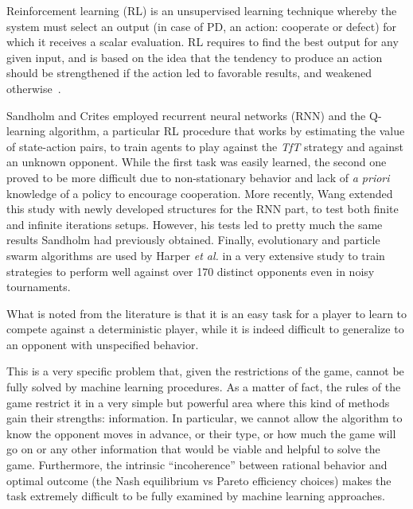\documentclass[journal,10pt,twoside]{IEEEtran}
\begin{document}
Reinforcement learning (RL) is an unsupervised learning technique whereby the system must select an output (in case of PD, an action: cooperate or defect) for which it receives a scalar evaluation. RL requires to find the best output for any given input, and is based on the idea that the tendency to produce an action should be strengthened if the action led to favorable results, and weakened otherwise~\cite{sandholmRL}.

Sandholm and Crites \cite{sandholmRL} employed recurrent neural networks (RNN) and the Q-learning algorithm, a particular RL procedure that works by estimating the value of state-action pairs, to train agents to play against the \textit{TfT} strategy and against an unknown opponent. While the first task was easily learned, the second one proved to be more difficult due to non-stationary behavior and lack of \textit{a priori} knowledge of a policy to encourage cooperation.
More recently, Wang \cite{kedaoRL} extended this study with newly developed structures for the RNN part, to test both finite and infinite iterations setups. However, his tests led to pretty much the same results Sandholm had previously obtained.
Finally, evolutionary and particle swarm algorithms are used by Harper \textit{et al.} in a very extensive study \cite{plosRLdominant} to train strategies to perform well against over 170 distinct opponents even in noisy tournaments.

What is noted from the literature is that it is an easy task for a player to learn to compete against a deterministic player, while it is indeed difficult to generalize to an opponent with unspecified behavior.

This is a very specific problem that, given the restrictions of the game, cannot be fully solved by machine learning procedures. As a matter of fact, the rules of the game restrict it in a very simple but powerful area where this kind of methods gain their strengths: information. In particular, we cannot allow the algorithm to know the opponent moves in advance, or their type, or how much the game will go on or any other information that would be viable and helpful to solve the game. Furthermore, the intrinsic ``incoherence'' between rational behavior and optimal outcome (the Nash equilibrium vs Pareto efficiency choices) makes the task extremely difficult to be fully examined by machine learning approaches.
\end{document}
